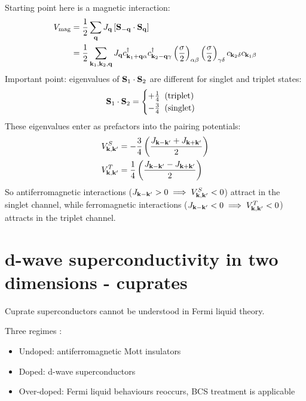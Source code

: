 Starting point here is a magnetic interaction:
\begin{align}
    V_{\text{mag}} &= \frac{1}{2} \sum_{\mathbf{q}} J_{\mathbf{q}} \left[\mathbf{S}_{-\mathbf{q}} \cdot \mathbf{S}_{\mathbf{q}}\right] \\
    &= \frac{1}{2} \sum_{\mathbf{k}_1, \mathbf{k}_2, \mathbf{q}} J_{\mathbf{q}} c_{\mathbf{k}_1 + \mathbf{q} \alpha}^{\dagger} c_{\mathbf{k}_2 - \mathbf{q} \gamma}^{\dagger} \left( \frac{\mathbf{\sigma}}{2} \right)_{\alpha \beta} \left( \frac{\mathbf{\sigma}}{2} \right)_{\gamma \delta} c_{\mathbf{k}_2 \delta} c_{\mathbf{k}_1 \beta}
\end{align}
Important point: eigenvalues of \(\mathbf{S}_1 \cdot \mathbf{S}_2\) are different for singlet and triplet states:
\begin{equation}
    \mathbf{S}_1 \cdot \mathbf{S}_2 =
    \begin{cases}
        + \frac{1}{4} \;\; \text{(triplet)} \\
        - \frac{3}{4} \;\; \text{(singlet)}
    \end{cases}
\end{equation}
These eigenvalues enter as prefactors into the pairing potentials:
\begin{align}
    V_{\mathbf{k}, \mathbf{k}^{\prime}}^S &= -\frac{3}{4} \left( \frac{J_{\mathbf{k} - \mathbf{k}^{\prime}} + J_{\mathbf{k} + \mathbf{k}^{\prime}}}{2} \right) \\
    V_{\mathbf{k}, \mathbf{k}^{\prime}}^T &= \frac{1}{4} \left( \frac{J_{\mathbf{k} - \mathbf{k}^{\prime}} - J_{\mathbf{k} + \mathbf{k}^{\prime}}}{2} \right)
\end{align}
So antiferromagnetic interactions (\(J_{\mathbf{k}-\mathbf{k}^{\prime}} > 0 \implies V_{\mathbf{k}, \mathbf{k}^{\prime}}^S < 0\)) attract in the singlet channel, while ferromagnetic interactions (\(J_{\mathbf{k}-\mathbf{k}^{\prime}} < 0 \implies V_{\mathbf{k}, \mathbf{k}^{\prime}}^T < 0\)) attracts in the triplet channel.

\section{d-wave superconductivity in two dimensions - cuprates}

Cuprate superconductors  cannot be understood in Fermi liquid theory.

Three regimes :
\begin{itemize}
    \item Undoped: antiferromagnetic Mott insulators
    \item Doped: d-wave superconductors
    \item Over-doped: Fermi liquid behaviours reoccurs, BCS treatment is applicable  
\end{itemize}

